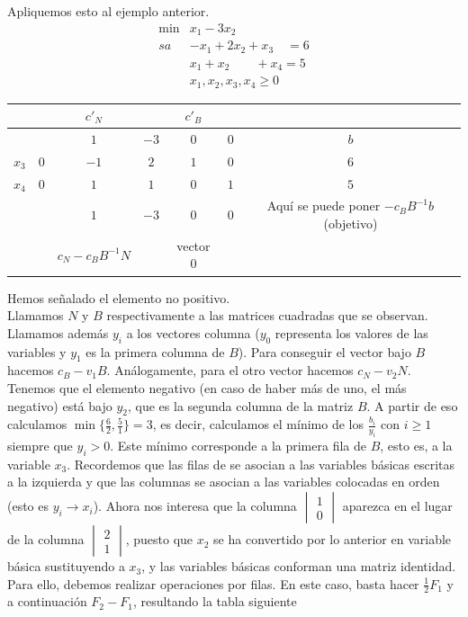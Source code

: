 \documentclass[PM.tex]{subfiles}
\begin{document}
Apliquemos esto al ejemplo anterior.
\begin{align*}
\min &x_1-3x_2\\
sa & -x_1+2x_2+x_3 \quad = 6\\
   & x_1+x_2 \qquad +x_4 = 5\\
   &x_1,x_2,x_3,x_4\geq 0
\end{align*}
\begin{tabular}{|c|c| c c| c c|c|}

&             &     $c'_N$ & & $c'_B$ & & \\
\hline
 &            & $1$ & $-3$ & $0$ & $0$ & $b$  \\
 \hline
 $x_3$ & $0$ & $-1$ & $2$ &   $1$ &   $0$ & $6$\\
  $x_4$ & $0$ & $1$ & $1$ &    $0$ &  $1$ & $5$\\
 \hline
 &            & $1$ & $\boxed{-3}$ & $0$ & $0$ & Aquí se puede poner $-c_BB^{-1}b$ (objetivo)\\
 \hline
 &             &  $c_N -c_BB^{-1}N$ & & vector $0$& &

\end{tabular}

Hemos señalado el elemento no positivo. \\

Llamamos $N$ y $B$ respectivamente a las matrices cuadradas que se observan.  Llamamos además $y_i$ a los vectores columna ($y_0$ representa los valores de las variables y $y_1$ es la primera columna de $B$). Para conseguir el vector bajo $B$ hacemos $c_B-v_1 B$. Análogamente, para el otro vector hacemos $c_N-v_2 N$. Tenemos que el elemento negativo (en caso de haber más de uno, el más negativo) está bajo $y_2$, que es la segunda columna de la matriz $B$. A partir de eso calculamos $\min\{\frac{6}{2}, \frac{5}{1}\}=3$, es decir, calculamos el mínimo de los $\frac{b_i}{y_i}$ con $i\geq 1$ siempre que $y_i>0$. Este mínimo corresponde a la primera fila de $B$, esto es, a la variable $x_3$. Recordemos que las filas de se asocian a las variables básicas escritas a la izquierda y que las columnas se asocian a las variables colocadas en orden (esto es $y_i\rightarrow x_i$). Ahora nos interesa que la columna $\begin{vmatrix}
1\\
0
\end{vmatrix}$ aparezca en el lugar de la columna $\begin{vmatrix}
2\\
1
\end{vmatrix}$, puesto que $x_2$ se ha convertido por lo anterior en variable básica sustituyendo a $x_3$, y las variables básicas conforman una matriz identidad. Para ello, debemos realizar operaciones por filas. En este caso, basta hacer $\frac{1}{2}F_1$ y a continuación $F_2-F_1$, resultando la tabla siguiente
\end{document}

